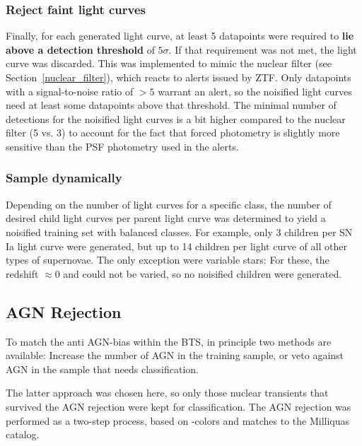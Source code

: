 \subsubsection{Reject faint light curves}
Finally, for each generated light curve, at least 5 datapoints were required to \textbf{lie above a detection threshold} of $5 \sigma$. If that requirement was not met, the light curve was discarded. This was implemented to mimic the nuclear filter (see Section~\ref{nuclear_filter}), which reacts to alerts issued by ZTF. Only datapoints with a signal-to-noise ratio of $>5$ warrant an alert, so the noisified light curves need at least some datapoints above that threshold. The minimal number of detections for the noisified light curves is a bit higher compared to the nuclear filter (5 vs. 3) to account for the fact that forced photometry is slightly more sensitive than the PSF photometry used in the alerts.

\subsubsection{Sample dynamically}
Depending on the number of light curves for a specific class, the number of desired child light curves per parent light curve was determined to yield a noisified training set with balanced classes. For example, only 3 children per SN Ia light curve were generated, but up to 14 children per light curve of all other types of supernovae. The only exception were variable stars: For these, the redshift $\approx 0$ and could not be varied, so no noisified children were generated.

\subsection{AGN Rejection}
To match the anti AGN-bias within the BTS, in principle two methods are available: Increase the number of AGN in the training sample, or veto against AGN in the sample that needs classification.

The latter approach was chosen here, so only those nuclear transients that survived the AGN rejection were kept for classification. The AGN rejection was performed as a two-step process, based on -colors and matches to the Milliquas catalog.

